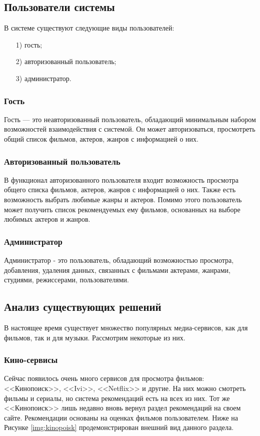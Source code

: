 \subsection{Пользователи системы}
В системе существуют следующие виды пользователей:
\begin{itemize}
	\item[1)] гость;
	\item[2)] авторизованный пользователь;
	\item[3)] администратор.
	
\end{itemize}

\subsubsection{Гость}
Гость — это неавторизованный пользователь, обладающий минимальным набором возможностей взаимодействия с системой. Он может авторизоваться, просмотреть общий список фильмов, актеров, жанров с информацией о них.
\subsubsection{Авторизованный пользователь}
В функционал авторизованного пользователя входит возможность просмотра общего списка фильмов, актеров, жанров с информацией о них. Также есть возможность выбрать любимые жанры и актеров. Помимо этого пользователь может получить список рекомендуемых ему фильмов, основанных на выборе любимых актеров и жанров.
\subsubsection{Администратор}
Администратор - это пользователь, обладающий возможностью просмотра, добавления, удаления данных, связанных с фильмами актерами, жанрами, студиями, режиссерами, пользователями.

\subsection{Анализ существующих решений}
В настоящее время существует множество популярных медиа-сервисов, как для фильмов, так и для музыки. Рассмотрим некоторые из них.

\subsubsection{Кино-сервисы}
Сейчас появилось очень много сервисов для просмотра фильмов: <<Кинопоиск>>, <<Ivi>>, <<Netflix>>  и другие. На них можно смотреть фильмы и сериалы, но система рекомендаций есть на всех из них. Тот же <<Кинопоиск>> лишь недавно вновь вернул раздел рекомендаций на своем сайте. Рекомендации основаны на оценках фильмов пользователем. Ниже на Рисунке \ref{img:kinopoisk} продемонстрирован внешний вид данного раздела.

